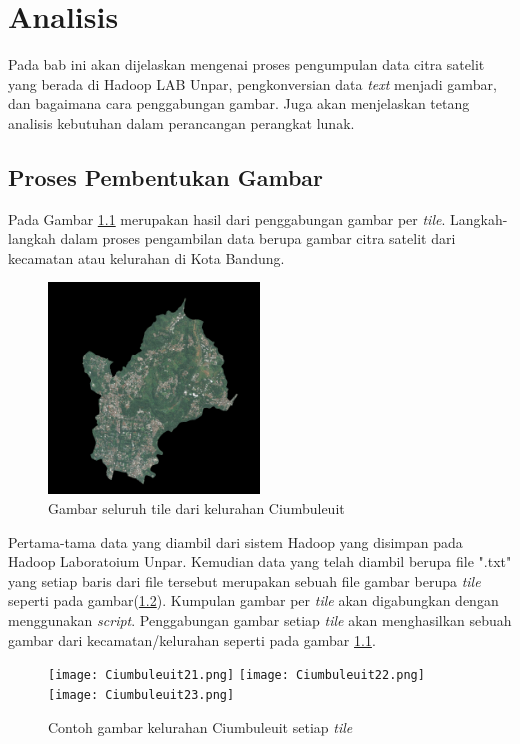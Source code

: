 \chapter{Analisis}
\label{chap:analisis}
Pada bab ini akan dijelaskan mengenai proses pengumpulan data citra satelit yang berada di Hadoop LAB Unpar, pengkonversian data \textit{text} menjadi gambar, dan bagaimana cara penggabungan gambar. Juga akan menjelaskan tetang analisis kebutuhan dalam perancangan perangkat lunak. 

\section{Proses Pembentukan Gambar}
Pada Gambar \ref{fig:ciumbuleuit} merupakan hasil dari penggabungan gambar per \textit{tile}. Langkah-langkah dalam proses pengambilan data berupa gambar citra satelit dari kecamatan atau kelurahan di Kota Bandung. 
\begin{figure}[H]
	\centering
	\includegraphics[width=0.5\textwidth]{Gambar/Ciumbuleuit.png}
	\caption{Gambar seluruh tile dari kelurahan Ciumbuleuit}
	\label{fig:ciumbuleuit}
\end{figure} 

Pertama-tama data yang diambil dari sistem Hadoop yang disimpan pada Hadoop Laboratoium Unpar. Kemudian data yang telah diambil berupa file ".txt" yang setiap baris dari file tersebut merupakan sebuah file gambar berupa \textit{tile} seperti pada gambar(\ref{fig:tileCiumbuleuit}). Kumpulan gambar per \textit{tile} akan digabungkan dengan menggunakan \textit{script}. Penggabungan gambar setiap \textit{tile} akan menghasilkan sebuah gambar dari kecamatan/kelurahan seperti pada gambar \ref{fig:ciumbuleuit}.

\begin{figure}[htp]
	\centering
	\texttt{[image: Ciumbuleuit21.png]}
	\texttt{[image: Ciumbuleuit22.png]}
	\texttt{[image: Ciumbuleuit23.png]}
	\caption{Contoh gambar kelurahan Ciumbuleuit setiap \textit{tile}}
	\label{fig:tileCiumbuleuit}
\end{figure}

